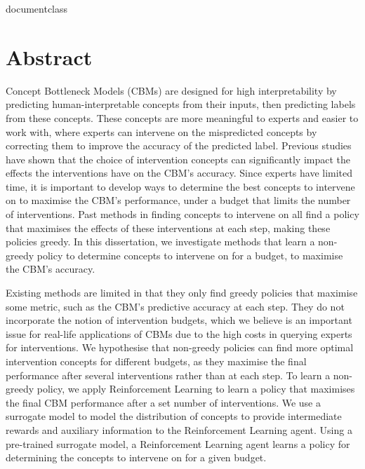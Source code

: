 \csname documentclass

\chapter*{Abstract}




Concept Bottleneck Models (CBMs) are designed for high interpretability by predicting 
human-interpretable concepts from their inputs,
then predicting labels from these concepts. 
These concepts are more meaningful to
experts and easier to work with, where experts
can intervene on the 
mispredicted concepts
by correcting them to improve the accuracy of the predicted label. Previous 
studies have shown that the choice of intervention concepts 
can significantly impact the effects 
the interventions have on the CBM's accuracy.
Since experts have limited time, it is important to develop ways to
determine the best concepts to intervene on to maximise the 
CBM's performance,
under a budget that limits the number 
of interventions.
Past methods in finding concepts to intervene on
all find a policy
that maximises the effects of these interventions
at each step, making these policies greedy.
In this dissertation,
we investigate methods that learn a non-greedy policy 
to determine
concepts to intervene on
for a budget, to maximise the CBM's accuracy.

Existing methods
are limited in that they only 
find greedy policies that
maximise some metric,
such as the CBM's predictive accuracy
at each step.
They do not incorporate the notion of intervention budgets,
which we believe is an important issue for real-life applications
of CBMs 
due to the high costs in querying experts for interventions.
We hypothesise that non-greedy policies can find more optimal intervention concepts for different
budgets,
as they maximise the final performance after several interventions rather than at each step.
To learn a non-greedy policy, we apply Reinforcement 
Learning to learn a policy
that maximises the final CBM performance
after a set number of interventions.
We use a surrogate model to model the distribution of concepts to provide intermediate rewards and auxiliary information to the
Reinforcement Learning agent.
Using a pre-trained surrogate model, a Reinforcement Learning agent 
learns a policy for determining the concepts
to intervene on for a given budget.

